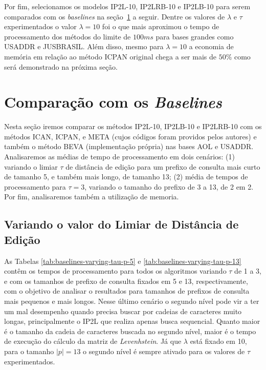 Por fim, selecionamos os modelos IP2L-10, IP2LRB-10 e IP2LB-10 para serem comparados com os \textit{baselines} na seção~\ref{sec:comparison_baseline_methods} a seguir. Dentre os valores de $\lambda$ e $\tau$ experimentados o valor $\lambda=10$ foi o que mais aproximou o tempo de processamento dos métodos do limite de $100ms$ para bases grandes como USADDR e JUSBRASIL. Além disso, mesmo para $\lambda=10$ a economia de memória em relação ao método ICPAN original chega a ser mais de $50\%$ como será demonstrado na próxima seção.


\section{Comparação com os \textit{Baselines}}
\label{sec:comparison_baseline_methods}

Nesta seção iremos comparar os métodos IP2L-10, IP2LB-10 e IP2LRB-10 com os métodos ICAN, ICPAN, e META (cujos códigos foram providos pelos autores) e também o método BEVA (implementação própria) nas bases AOL e USADDR. Analisaremos as médias de tempo de processamento em dois cenários: (1) variando o limiar $\tau$ de distância de edição para um prefixo de consulta mais curto de tamanho 5, e também mais longo, de tamanho 13; (2) média de tempos de processamento para $\tau=3$, variando o tamanho do prefixo de 3 a 13, de 2 em 2. Por fim, analisaremos também a utilização de memoria.

\subsection{Variando o valor do Limiar de Distância de Edição}

As Tabelas \ref{tab:baselines-varying-tau-p-5} e \ref{tab:baselines-varying-tau-p-13} contêm os tempos de processamento para todos os algoritmos variando $\tau$ de 1 a 3, e com os tamanhos de prefixo de consulta fixados em 5 e 13, respectivamente, com o objetivo de analisar o resultados para tamanhos de prefixos de consulta mais pequenos e mais longos. Nesse último cenário o segundo nível pode vir a ter um mal desempenho quando precisa buscar por cadeias de caracteres muito longas, principalmente o IP2L que realiza apenas busca sequencial. Quanto maior é o tamanho da cadeia de caracteres buscada no segundo nível, maior é o tempo de execução do cálculo da matriz de \textit{Levenhstein}. Já que $\lambda$ está fixado em 10, para o tamanho $|p|=13$ o segundo nível é sempre ativado para os valores de $\tau$ experimentados.

